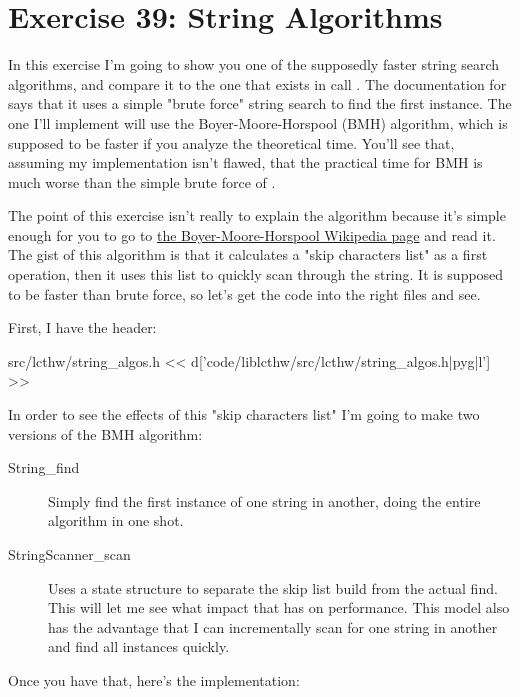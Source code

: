 \chapter{Exercise 39: String Algorithms}

In this exercise I'm going to show you one of the supposedly faster string
search algorithms, and compare it to the one that exists in 
call .  The documentation for  says that it uses a
simple "brute force" string search to find the first instance.  The one I'll
implement will use the Boyer-Moore-Horspool (BMH) algorithm, which is supposed
to be faster if you analyze the theoretical time.  You'll see that, assuming my
implementation isn't flawed, that the practical time for BMH is much worse than
the simple brute force of .

The point of this exercise isn't really to explain the algorithm because it's
simple enough for you to go to
\href{http://en.wikipedia.org/wiki/Boyer\%E2\%80\%93Moore\%E2\%80\%93Horspool\_algorithm}{the
Boyer-Moore-Horspool Wikipedia page} and read it.  The gist of this algorithm
is that it calculates a "skip characters list" as a first operation, then it
uses this list to quickly scan through the string.  It is supposed to be faster
than brute force, so let's get the code into the right files and see.

First, I have the header:

\begin{code}{src/lcthw/string\_algos.h}
<< d['code/liblcthw/src/lcthw/string_algos.h|pyg|l'] >>
\end{code}

In order to see the effects of this "skip characters list" I'm going to make
two versions of the BMH algorithm:

\begin{description}
\item[String\_find] Simply find the first instance of one string in another,
    doing the entire algorithm in one shot.
\item[StringScanner\_scan] Uses a  state structure to
    separate the skip list build from the actual find.  This will let me
    see what impact that has on performance.  This model also has the advantage
    that I can incrementally scan for one string in another and find all 
    instances quickly.
\end{description}

Once you have that, here's the implementation:

